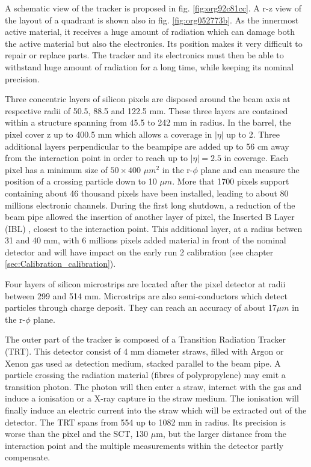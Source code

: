 A schematic view of the tracker is proposed in fig. \ref{fig:org92c81cc}.
A r-z view of the layout of a quadrant is shown also in fig. \ref{fig:org052773b}.
As the innermost active material, it receives a huge amount of radiation which can damage both the active material but also the electronics.
Its position makes it very difficult to repair or replace parts.
The tracker and its electronics must then be able to withstand huge amount of radiation for a long time, while keeping its nominal precision.

Three concentric layers of silicon pixels are disposed around the beam axis at respective radii of 50.5, 88.5 and 122.5 mm.
These three layers are contained within a structure spanning from 45.5 to 242 mm in radius.
In the barrel, the pixel cover z up to 400.5 mm which allows a coverage in $|\eta|$ up to 2.
Three additional layers perpendicular to the beampipe are added up to 56 cm away from the interaction point in order to reach up to \(|\eta|=2.5\) in coverage.
Each pixel has a minimum size of \(50\times400\) \(\mu m^2\) in the r-$\phi$ plane and can measure the position of a crossing particle down to 10 \(\mu m\).
More that 1700 pixels support containing about 46 thousand pixels have been installed, leading to about 80 millions electronic channels.
During the first long shutdown, a reduction of the beam pipe allowed the insertion of another layer of pixel, the Inserted B Layer (IBL) \cite{CERN-LHCC-2010-013,CERN-LHCC-2012-009}, closest to the interaction point.
This additional layer, at a radius betwen 31 and 40 mm, with 6 millions pixels added material in front of the nominal detector and will have impact on the early run 2 calibration (see chapter \ref{sec:Calibration_calibration}).

Four layers of silicon microstrips are located after the pixel detector at radii between 299 and 514 mm.
Microstrips are also semi-conductors which detect particles through charge deposit.
They can reach an accuracy of about 17\(\mu m\) in the r-$\phi$ plane.

The outer part of the tracker is composed of a Transition Radiation Tracker (TRT).
This detector consist of 4 mm diameter straws, filled with Argon or Xenon gas used as detection medium, stacked parallel to the beam pipe.
A particle crossing the radiation material (fibres of  polypropylene) may emit a transition photon.
The photon will then enter a straw, interact with the gas and induce a ionisation or a X-ray capture in the straw medium.
The ionisation will finally induce an electric current into the straw which will be extracted out of the detector.
The TRT spans from 554 up to 1082 mm in radius.
Its precision is worse than the pixel and the SCT, 130 \(\mu\text{m}\), but the larger distance from the interaction point and the multiple measurements within the detector partly compensate.

